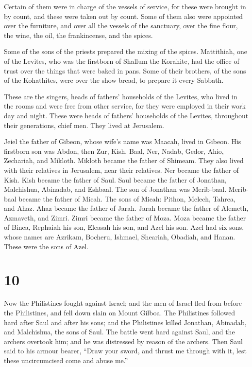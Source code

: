  Certain of them were in charge of the vessels of service,
for these were brought in by count, and these were taken out by count.
 Some of them also were appointed over the furniture, and
over all the vessels of the sanctuary, over the fine flour, the wine,
the oil, the frankincense, and the spices.

 Some of the sons of the priests prepared the mixing of the
spices.  Mattithiah, one of the Levites, who was the
firstborn of Shallum the Korahite, had the office of trust over the
things that were baked in pans.  Some of their brothers, of
the sons of the Kohathites, were over the show bread, to prepare it
every Sabbath.

 These are the singers, heads of fathers' households of the
Levites, who lived in the rooms and were free from other service, for
they were employed in their work day and night.  These were
heads of fathers' households of the Levites, throughout their
generations, chief men. They lived at Jerusalem.

 Jeiel the father of Gibeon, whose wife's name was Maacah,
lived in Gibeon.  His firstborn son was Abdon, then Zur,
Kish, Baal, Ner, Nadab,  Gedor, Ahio, Zechariah, and
Mikloth.  Mikloth became the father of Shimeam. They also
lived with their relatives in Jerusalem, near their relatives.
 Ner became the father of Kish. Kish became the father of
Saul. Saul became the father of Jonathan, Malchishua, Abinadab, and
Eshbaal.  The son of Jonathan was Merib-baal. Merib-baal
became the father of Micah.  The sons of Micah: Pithon,
Melech, Tahrea, and Ahaz.  Ahaz became the father of Jarah.
Jarah became the father of Alemeth, Azmaveth, and Zimri. Zimri became
the father of Moza.  Moza became the father of Binea,
Rephaiah his son, Eleasah his son, and Azel his son.  Azel
had six sons, whose names are Azrikam, Bocheru, Ishmael, Sheariah,
Obadiah, and Hanan. These were the sons of Azel.

\hypertarget{section-9}{%
\section{10}\label{section-9}}

 Now the Philistines fought against Israel; and the men of
Israel fled from before the Philistines, and fell down slain on Mount
Gilboa.  The Philistines followed hard after Saul and after
his sons; and the Philistines killed Jonathan, Abinadab, and Malchishua,
the sons of Saul.  The battle went hard against Saul, and
the archers overtook him; and he was distressed by reason of the
archers.  Then Saul said to his armour bearer, ``Draw your
sword, and thrust me through with it, lest these uncircumcised come and
abuse me.''


